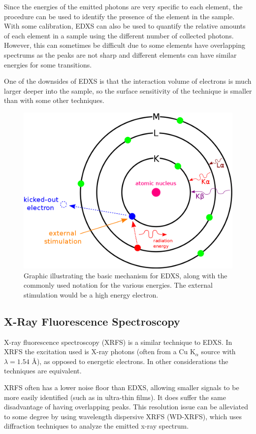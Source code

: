 Since the energies of the emitted photons are very specific to each element, the procedure can be used to identify the presence of the element in the sample. With some calibration, EDXS can also be used to quantify the relative amounts of each element in a sample using the different number of collected photons. However, this can sometimes be difficult due to some elements have overlapping spectrums as the peaks are not sharp and different elements can have similar energies for some transitions. 

One of the downsides of EDXS is that the interaction volume of electrons is much larger deeper into the sample, so the surface sensitivity of the technique is smaller than with some other techniques. 

\begin{figure}[htbp]
   \centering
   \includegraphics[width=0.66\linewidth]{./figures/characterization/EDXS-scheme} 
   \caption[Illustration of EDXS principle]%
   		{Graphic illustrating the basic mechanism for EDXS, along with the commonly used %
		notation for the various energies. The external stimulation would be a high energy %
		electron.}
   \label{fig:EDXS-image}
\end{figure}




\subsection{X-Ray Fluorescence Spectroscopy}

X-ray fluorescence spectroscopy (XRFS) is a similar technique to EDXS. In XRFS the excitation used is X-ray photons (often from a Cu K$_{\alpha}$ source with $\lambda = 1.54$ \AA), as opposed to energetic electrons. In other considerations the techniques are equivalent. 

XRFS often has a lower noise floor than EDXS, allowing smaller signals to be more easily identified (such as in ultra-thin films). It does suffer the same disadvantage of having overlapping peaks. This resolution issue can be alleviated to some degree by using wavelength dispersive XRFS (WD-XRFS), which uses diffraction techniques to analyze the emitted x-ray spectrum. 

